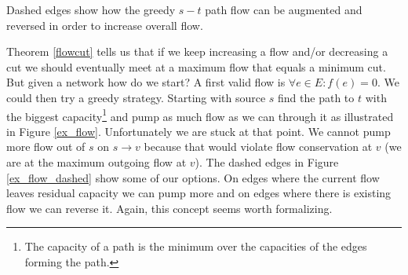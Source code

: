 \begin{marginfigure}
    \caption{Dashed edges show how the greedy $s-t$ path flow can be augmented and reversed in order to increase overall flow.}
	\label{ex_flow_dashed}
\end{marginfigure}

Theorem \ref{flowcut} tells us that if we keep increasing a flow and/or decreasing a cut we should eventually meet at a maximum flow that equals a minimum cut. But given a network how do we start? A first valid flow is $\forall e \in E: f(e) = 0$. We could then try a greedy strategy. Starting with source $s$ find the path to $t$ with the biggest capacity\footnote{The capacity of a path is the minimum over the capacities of the edges forming the path.} and pump as much flow as we can through it as illustrated in Figure \ref{ex_flow}. Unfortunately we are stuck at that point. We cannot pump more flow out of $s$ on $s \rightarrow v$ because that would violate flow conservation at $v$ (we are at the maximum outgoing flow at $v$). The dashed edges in Figure \ref{ex_flow_dashed} show some of our options. On edges where the current flow leaves residual capacity we can pump more and on edges where there is existing flow we can reverse it. Again, this concept seems worth formalizing.

